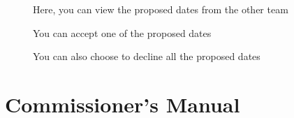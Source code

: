 \documentclass{article}
\begin{document}
\begin{figure}[H]
    \centering
    \caption{Here, you can view the proposed dates from the other team}
\end{figure}

\begin{figure}[H]
    \centering
    \caption{You can accept one of the proposed dates}
\end{figure}


\begin{figure}[H]
    \centering
    \caption{You can also choose to decline all the proposed dates}
\end{figure}

\section{Commissioner's Manual}
\end{document}
